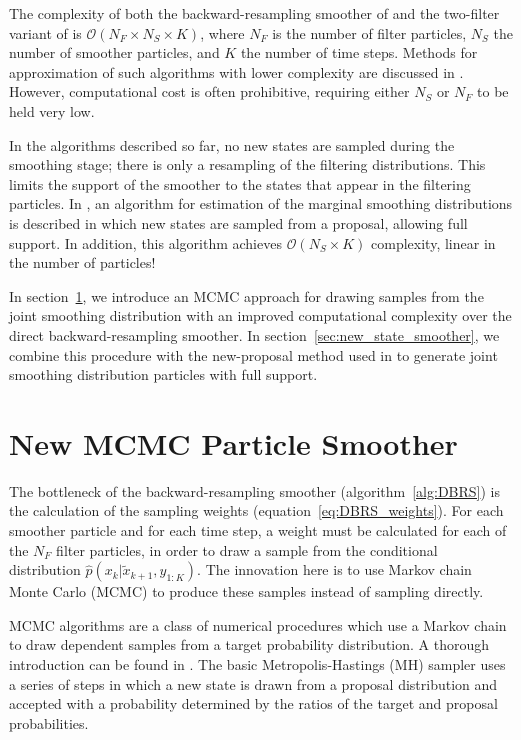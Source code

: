 \documentclass[journal]{IEEEtran}
\begin{document}
The complexity of both the backward-resampling smoother of \cite{Godsill2004} and the two-filter variant of \cite{Briers2010} is $\mathcal{O}(N_F \times N_S \times K)$, where $N_F$ is the number of filter particles, $N_S$ the number of smoother particles, and $K$ the number of time steps. Methods for approximation of such algorithms with lower complexity are discussed in \cite{Klaas2006}. However, computational cost is often prohibitive, requiring either $N_S$ or $N_F$ to be held very low. 

In the algorithms described so far, no new states are sampled during the smoothing stage; there is only a resampling of the filtering distributions. This limits the support of the smoother to the states that appear in the filtering particles. In \cite{Fearnhead2010}, an algorithm for estimation of the marginal smoothing distributions is described in which new states are sampled from a proposal, allowing full support. In addition, this algorithm achieves $\mathcal{O}( N_S \times K)$ complexity, linear in the number of particles!

In section~\ref{sec:mcmc_smoother}, we introduce an MCMC approach for drawing samples from the joint smoothing distribution with an improved computational complexity over the direct backward-resampling smoother. In section~\ref{sec:new_state_smoother}, we combine this procedure with the new-proposal method used in \cite{Fearnhead2010} to generate joint smoothing distribution particles with full support.



\section{New MCMC Particle Smoother} \label{sec:mcmc_smoother}

The bottleneck of the backward-resampling smoother (algorithm~\ref{alg:DBRS}) is the calculation of the sampling weights (equation~\ref{eq:DBRS_weights}). For each smoother particle and for each time step, a weight must be calculated for each of the $N_F$ filter particles, in order to draw a sample from the conditional distribution $\hat{p}(x_k|\tilde{x}_{k+1}, y_{1:K})$. The innovation here is to use Markov chain Monte Carlo (MCMC) to produce these samples instead of sampling directly.

MCMC algorithms are a class of numerical procedures which use a Markov chain to draw dependent samples from a target probability distribution. A thorough introduction can be found in \cite{Gilks1996}. The basic Metropolis-Hastings (MH) \cite{Metropolis1953} sampler uses a series of steps in which a new state is drawn from a proposal distribution and accepted with a probability determined by the ratios of the target and proposal probabilities.
\end{document}

